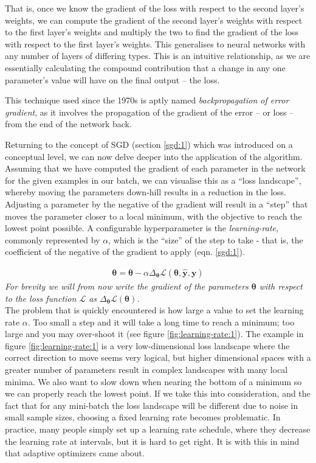 \documentclass{report}
\begin{document}
	That is, once we know the gradient of the loss with respect to the second layer's weights, we can compute the gradient of the second layer's weights with respect to the first layer's weights and multiply the two to find the gradient of the loss with respect to the first layer's weights. This generalises to neural networks with any number of layers of differing types. This is an intuitive relationship, as we are essentially calculating the compound contribution that a change in any one parameter's value will have on the final output -- the loss.  \par
	This technique used since the 1970s \parencite{backprop} is aptly named \textit{backpropagation of error gradient}, as it involves the propagation of the gradient of the error -- or loss -- from the end of the network back. \par
	Returning to the concept of SGD (section \ref{sgd:1}) which was introduced on a conceptual level, we can now delve deeper into the application of the algorithm. Assuming that we have computed the gradient of each parameter in the network for the given examples in our batch, we can visualise this as a ``loss landscape'', whereby moving the parameters down-hill results in a reduction in the loss. Adjusting a parameter by the negative of the gradient will result in a ``step'' that moves the parameter closer to a local minimum, with the objective to reach the lowest point possible. A configurable hyperparameter is the \textit{learning-rate}, commonly represented by $\alpha$, which is the ``size'' of the step to take - that is, the coefficient of the negative of the gradient to apply (eqn. \ref{sgd:1}). \par
	\begin{align} \label{sgd:1}
		\bm{\theta} = \bm{\theta} - \alpha \Delta_{\bm{\theta}} \mathcal{L}(\bm{\theta}, \bm{\hat{y}}, \bm{y})
	\end{align}
	\textit{For brevity we will from now write the gradient of the parameters $\bm{\theta}$ with respect to the loss function $\mathcal{L}$ as $\Delta_{\bm{\theta}} \mathcal{L}(\bm{\theta})$.} \\
	The problem that is quickly encountered is how large a value to set the learning rate $\alpha$. Too small a step and it will take a long time to reach a minimum; too large and you may over-shoot it (see figure \ref{fig:learning-rate:1}). The example in figure \ref{fig:learning-rate:1} is a very low-dimensional loss landscape where the correct direction to move seems very logical, but higher dimensional spaces with a greater number of parameters result in complex landscapes with many local minima. We also want to slow down when nearing the bottom of a minimum so we can properly reach the lowest point. If we take this into consideration, and the fact that for any mini-batch the loss landscape will be different due to noise in small sample sizes, choosing a fixed learning rate becomes problematic. In practice, many people simply set up a learning rate schedule, where they decrease the learning rate at intervals, but it is hard to get right. It is with this in mind that adaptive optimizers came about. \par
\end{document}
